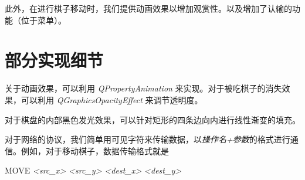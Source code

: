 \documentclass[11pt,a4paper]{article}
\begin{document}
此外，在进行棋子移动时，我们提供动画效果以增加观赏性。以及增加了认输的功能（位于菜单）。

\section{部分实现细节}
关于动画效果，可以利用 {\it QPropertyAnimation} 来实现。对于被吃棋子的消失效果，可以利用 {\it QGraphicsOpacityEffect} 来调节透明度。

对于棋盘的内部黑色发光效果，可以针对矩形的四条边向内进行线性渐变的填充。

对于网络的协议，我们简单用可见字符来传输数据，以{\it 操作名+参数}的格式进行通信。例如，对于移动棋子，数据传输格式就是
\begin{center}
	MOVE {\it <src\_x> <src\_y> <dest\_x> <dest\_y>}
\end{center}
\end{document}
